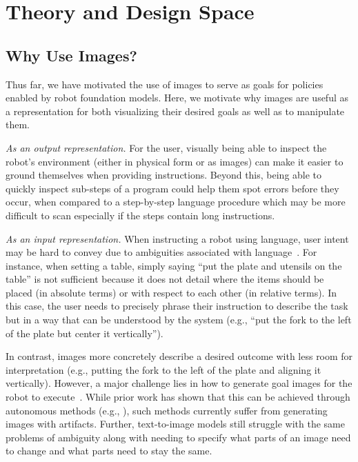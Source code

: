 \section{Theory and Design Space}
\subsection{Why Use Images?}
Thus far, we have motivated the use of images to serve as goals for policies enabled by robot foundation models. Here, we motivate why images are useful as a representation for both visualizing their desired goals as well as to manipulate them.


\noindent \emph{As an output representation.} For the user, visually being able to inspect the robot's environment (either in physical form or as images) can make it easier to ground themselves when providing instructions. Beyond this, being able to quickly inspect sub-steps of a program could help them spot errors before they occur, when compared to a step-by-step language procedure which may be more difficult to scan especially if the steps contain long instructions.

\noindent \emph{As an input representation.} When instructing a robot using language, user intent may be hard to convey due to ambiguities associated with language~\cite{masson2024directgpt, sundaresan2024rt}. For instance, when setting a table, simply saying ``put the plate and utensils on the table'' is not sufficient because it does not detail where the items should be placed (in absolute terms) or with respect to each other (in relative terms). In this case, the user needs to precisely phrase their instruction to describe the task but in a way that can be understood by the system (e.g., ``put the fork to the left of the plate but center it vertically''). 

In contrast, images more concretely describe a desired outcome with less room for interpretation (e.g., putting the fork to the left of the plate and aligning it vertically). However, a major challenge lies in how to generate goal images for the robot to execute~\cite{sundaresan2024rt}. While prior work has shown that this can be achieved through autonomous methods (e.g., \cite{black2023zero}), such methods currently suffer from generating images with artifacts. Further, text-to-image models still struggle with the same problems of ambiguity along with needing to specify what parts of an image need to change and what parts need to stay the same. 


